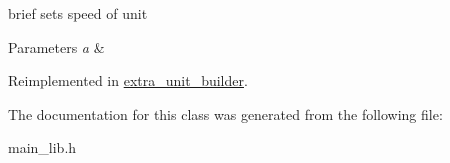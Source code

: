 brief sets speed of unit 
\begin{DoxyParams}{Parameters}
{\em a} & \\
\hline
\end{DoxyParams}


Reimplemented in \mbox{\hyperlink{classextra__unit__builder_aa95d6dcfba85a06592d6725baebd51cc}{extra\+\_\+unit\+\_\+builder}}.



The documentation for this class was generated from the following file\+:\begin{DoxyCompactItemize}
\item 
main\+\_\+lib.\+h\end{DoxyCompactItemize}
